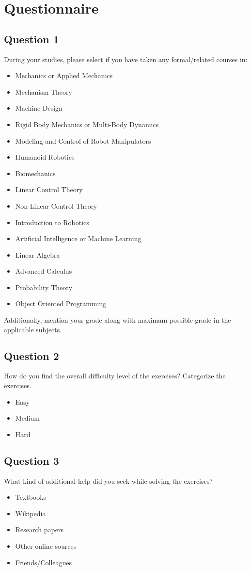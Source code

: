 \chapter{Questionnaire}

\section{Question 1}
During your studies, please select if you have taken any formal/related courses in:
\begin{itemize}
\item Mechanics or Applied Mechanics
\item Mechanism Theory
\item Machine Design
\item Rigid Body Mechanics or Multi-Body Dynamics
\item Modeling and Control of Robot Manipulators
\item Humanoid Robotics
\item Biomechanics
\item Linear Control Theory
\item Non-Linear Control Theory
\item Introduction to Robotics
\item Artificial Intelligence or Machine Learning
\item Linear Algebra
\item Advanced Calculus
\item Probability Theory
\item Object Oriented Programming
\end{itemize}
Additionally, mention your grade along with maximum possible grade in the applicable subjects.

\section{Question 2}
How do you find the overall difficulty level of the exercises? Categorize the exercises.
\begin{itemize}
\item Easy
\item Medium
\item Hard
\end{itemize}

\section{Question 3}
What kind of additional help did you seek while solving the exercises?
\begin{itemize}
\item Textbooks
\item Wikipedia
\item Research papers
\item Other online sources
\item Friends/Colleagues
\end{itemize}

